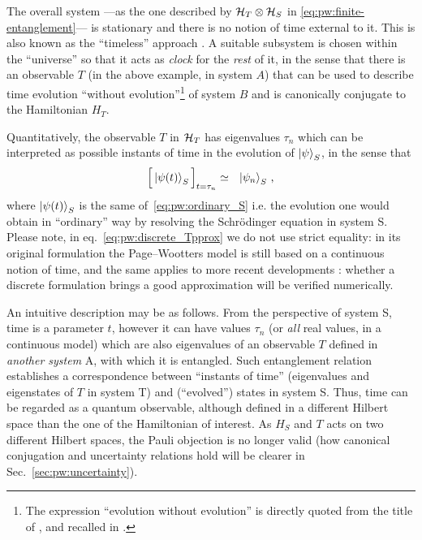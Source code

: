 The overall system
---as the one described by $\mathcal{H}_T \otimes \mathcal{H}_S$ in \eqref{eq:pw:finite-entanglement}---
is stationary and there is no notion
of time external to it.
This is also known as the
``timeless'' approach \parencite{Marletto:Evolution}.
\citereset
A suitable subsystem is chosen within the ``universe'' so that it acts as
\emph{clock} for the \emph{rest} of it, in the sense that
there is an observable $T$ (in the above example, in system $A$)
that can be used to
describe time evolution ``without evolution''\footnote{
  The expression ``evolution without evolution''
  is directly quoted from the title of \cite{PageWootters},
  and recalled in \cite{Marletto:Evolution}.
}
of system $B$
and is canonically conjugate to the Hamiltonian $H_T$.


Quantitatively,
the observable $T$ in $\mathcal{H}_T$
has eigenvalues $\tau_n$ which can be interpreted as possible
instants of time in the evolution of $\ket{\psi}_S$, in the sense that
\begin{equation}\label{eq:pw:discrete_Tpprox}
  \Big[ \ket{\psi(t)}_S \Big]_{t=\tau_n} \simeq \,\,\,\, \ket{\psi_n}_S \, \text{,}
\end{equation}
where $\ket{\psi(t)}_S$ is the same of~\eqref{eq:pw:ordinary_S} i.e.
the evolution one would obtain in ``ordinary'' way
by resolving the Schr\"{o}dinger equation in system S.
Please note, in eq.~\eqref{eq:pw:discrete_Tpprox} we do not use strict equality:
in its original formulation the Page--Wootters model is still based on a continuous
notion of time, and the same applies to more recent developments \parencite{Lloyd:Time}:
whether a discrete formulation
brings a good approximation
will be verified numerically.

An intuitive description may be as follows.
From the perspective of system S, time is a parameter $t$, however it can have values
$\tau_n$ (or \emph{all} real values, in a continuous model)
which are also eigenvalues of an observable $T$ defined in \emph{another system} A,
with which it is entangled. Such entanglement relation establishes a correspondence
between ``instants of time'' (eigenvalues and eigenstates of $T$ in system T)
and (``evolved'') states in system S. Thus, time can be regarded as a quantum observable,
although defined in a different Hilbert space than the one of the Hamiltonian of interest.
As $H_S$ and $T$ acts on two different Hilbert spaces, the Pauli objection is no longer valid
(how canonical conjugation and uncertainty relations hold will be clearer in Sec.~\ref{sec:pw:uncertainty}).

